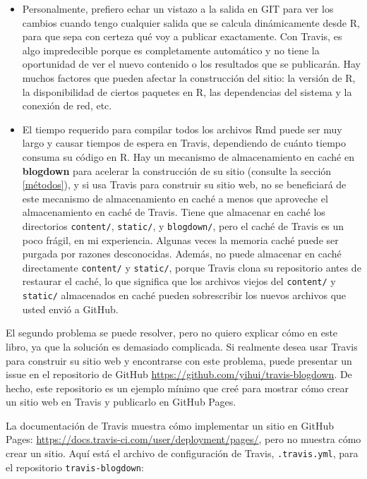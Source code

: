 \documentclass[12pt,]{krantz}
\theoremstyle{definition}
\theoremstyle{definition}
\theoremstyle{definition}
\theoremstyle{remark}
\begin{document}
\begin{itemize}
\item
  Personalmente, prefiero echar un vistazo a la salida en GIT para ver
  los cambios cuando tengo cualquier salida que se calcula dinámicamente
  desde R, para que sepa con certeza qué voy a publicar exactamente. Con
  Travis, es algo impredecible porque es completamente automático y no
  tiene la oportunidad de ver el nuevo contenido o los resultados que se
  publicarán. Hay muchos factores que pueden afectar la construcción del
  sitio: la versión de R, la disponibilidad de ciertos paquetes en R,
  las dependencias del sistema y la conexión de red, etc.
\item
  El tiempo requerido para compilar todos los archivos Rmd puede ser muy
  largo y causar tiempos de espera en Travis, dependiendo de cuánto
  tiempo consuma su código en R. Hay un mecanismo de almacenamiento en
  caché en \textbf{blogdown} para acelerar la construcción de su sitio
  (consulte la sección \ref{métodos}), y si usa Travis para construir su
  sitio web, no se beneficiará de este mecanismo de almacenamiento en
  caché a menos que aproveche el almacenamiento en caché de Travis.
  Tiene que almacenar en caché los directorios \texttt{content/},
  \texttt{static/}, y \texttt{blogdown/}, pero el caché de Travis es un
  poco frágil, en mi experiencia. Algunas veces la memoria caché puede
  ser purgada por razones desconocidas. Además, no puede almacenar en
  caché directamente \texttt{content/} y \texttt{static/}, porque Travis
  clona su repositorio antes de restaurar el caché, lo que significa que
  los archivos viejos del \texttt{content/} y \texttt{static/}
  almacenados en caché pueden sobrescribir los nuevos archivos que usted
  envió a GitHub.
\end{itemize}

El segundo problema se puede resolver, pero no quiero explicar cómo en
este libro, ya que la solución es demasiado complicada. Si realmente
desea usar Travis para construir su sitio web y encontrarse con este
problema, puede presentar un issue en el repositorio de GitHub
\url{https://github.com/yihui/travis-blogdown}. De hecho, este
repositorio es un ejemplo mínimo que creé para mostrar cómo crear un
sitio web en Travis y publicarlo en GitHub Pages.

La documentación de Travis muestra cómo implementar un sitio en GitHub
Pages: \url{https://docs.travis-ci.com/user/deployment/pages/}, pero no
muestra cómo crear un sitio. Aquí está el archivo de configuración de
Travis, \texttt{.travis.yml}, para el repositorio
\texttt{travis-blogdown}:
\end{document}

